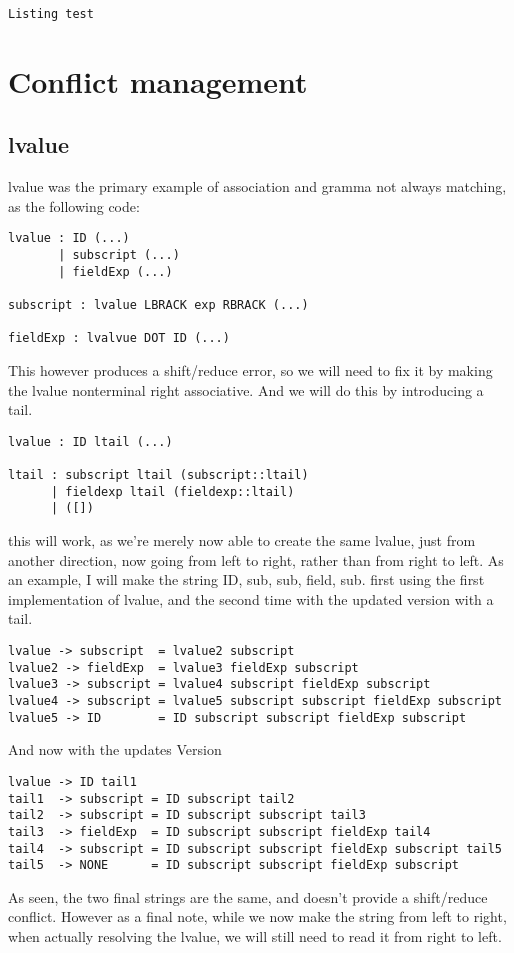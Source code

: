 \documentclass{article}
\begin{document}
\begin{lstlisting}[frame=single]
Listing test
\end{lstlisting}

\section{Conflict management}

\subsection{lvalue}
lvalue was the primary example of association and gramma not always matching, as the following code:
\begin{lstlisting}[frame=single]
lvalue : ID (...)
	   | subscript (...)
	   | fieldExp (...)

subscript : lvalue LBRACK exp RBRACK (...)

fieldExp : lvalvue DOT ID (...)

\end{lstlisting}

This however produces a shift/reduce error, so we will need to fix it by making the lvalue nonterminal right associative. And we will do this by introducing a tail.

\begin{lstlisting}[frame=single]
lvalue : ID ltail (...)

ltail : subscript ltail (subscript::ltail)
      | fieldexp ltail (fieldexp::ltail)
      | ([])
\end{lstlisting}

this will work, as we're merely now able to create the same lvalue, just from another direction, now going from left to right, rather than from right to left.
As an example, I will make the string ID, sub, sub, field, sub. first using the first implementation of lvalue, and the second time with the updated version with a tail.

\begin{lstlisting}[frame=single]
lvalue -> subscript  = lvalue2 subscript
lvalue2 -> fieldExp  = lvalue3 fieldExp subscript
lvalue3 -> subscript = lvalue4 subscript fieldExp subscript
lvalue4 -> subscript = lvalue5 subscript subscript fieldExp subscript
lvalue5 -> ID        = ID subscript subscript fieldExp subscript
\end{lstlisting}
And now with the updates Version
\begin{lstlisting}[frame=single]
lvalue -> ID tail1
tail1  -> subscript = ID subscript tail2
tail2  -> subscript = ID subscript subscript tail3
tail3  -> fieldExp  = ID subscript subscript fieldExp tail4
tail4  -> subscript = ID subscript subscript fieldExp subscript tail5
tail5  -> NONE      = ID subscript subscript fieldExp subscript
\end{lstlisting}
As seen, the two final strings are the same, and doesn't provide a shift/reduce conflict. However as a final note, while we now make the string from left to right, when actually resolving the lvalue, we will still need to read it from right to left.
\end{document}
